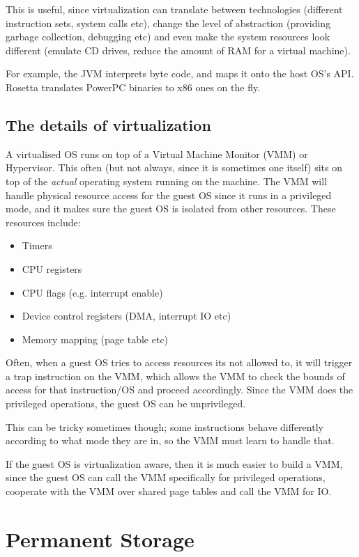 This is useful, since virtualization can translate between technologies
(different instruction sets, system calls etc), change the level of abstraction
(providing garbage collection, debugging etc) and even make the system resources
look different (emulate CD drives, reduce the amount of RAM for a virtual
machine).

For example, the JVM interprets byte code, and maps it onto the host OS's API.
Rosetta translates PowerPC binaries to x86 ones on the fly.

\subsection{The details of virtualization}

A virtualised OS runs on top of a Virtual Machine Monitor (VMM) or Hypervisor.
This often (but not always, since it is sometimes one itself) sits on top of the
\textit{actual} operating system running on the machine. The VMM will handle
physical resource access for the guest OS since it runs in a privileged mode,
and it makes sure the guest OS is isolated from other resources. These resources
include:

\begin{mymulticols}
  \begin{itemize}
    \item Timers
    \item CPU registers
    \item CPU flags (e.g. interrupt enable)
    \item Device control registers (DMA, interrupt IO etc)
    \item Memory mapping (page table etc)
  \end{itemize}
\end{mymulticols}

Often, when a guest OS tries to access resources its not allowed to, it will
trigger a trap instruction on the VMM, which allows the VMM to check the bounds
of access for that instruction/OS and proceed accordingly. Since the VMM does
the privileged operations, the guest OS can be unprivileged.

This can be tricky sometimes though; some instructions behave differently
according to what mode they are in, so the VMM must learn to handle that.

If the guest OS is virtualization aware, then it is much easier to build a VMM,
since the guest OS can call the VMM specifically for privileged operations,
cooperate with the VMM over shared page tables and call the VMM for IO.


\section{Permanent Storage}

